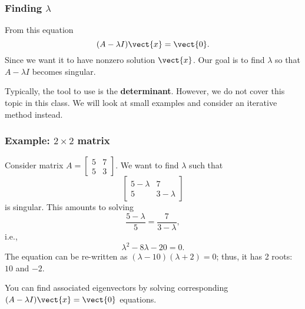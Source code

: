 \begin{frame}
  \frametitle{Finding $\lambda$}
  From this equation
  \[
  (A-\lambda I)\vect{x} = \vect{0}.
  \]
  Since we want it to have nonzero solution $\vect{x}$. Our goal is to
  find $\lambda$ so that $A-\lambda I$ becomes singular.

  \pause Typically, the tool to use is the {\bf determinant}.
  However, we do not cover this topic in this class.  We will look at
  small examples and consider an iterative method instead.
\end{frame}

\begin{frame}
  \frametitle{Example: $2\times 2$ matrix}

  Consider matrix $A=\begin{bmatrix}5 & 7 \\ 5 & 3\end{bmatrix}$.  We
  want to find $\lambda$ such that
  \[
  \begin{bmatrix}
    5-\lambda & 7 \\
    5 & 3-\lambda
  \end{bmatrix}
  \]
  is singular.  \pause This amounts to solving
  \[
  \frac{5-\lambda}{5} = \frac{7}{3-\lambda},
  \]
  \pause
  i.e.,
  \[
  \lambda^2 - 8\lambda - 20 = 0.
  \]
  \pause
  The equation can be re-written as $(\lambda-10)(\lambda+2)=0$; thus,
  it has 2 roots: $10$ and $-2$.

  \pause You can find associated eigenvectors by solving corresponding
  $(A-\lambda I)\vect{x}=\vect{0}$ equations.
\end{frame}

